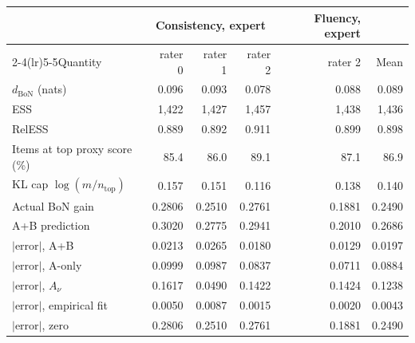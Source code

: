 \begin{tabular}{lrrrrr}
\toprule
 & \multicolumn{3}{c}{Consistency, expert} & Fluency, expert &  \\
\cmidrule(lr){2-4}\cmidrule(lr){5-5}Quantity & rater 0 & rater 1 & rater 2 & rater 2 & Mean \\
\midrule
$d_{\mathrm{BoN}}$ (nats) & 0.096 & 0.093 & 0.078 & 0.088 & 0.089 \\
ESS & 1{,}422 & 1{,}427 & 1{,}457 & 1{,}438 & 1{,}436 \\
RelESS & 0.889 & 0.892 & 0.911 & 0.899 & 0.898 \\
Items at top proxy score (\%) & 85.4 & 86.0 & 89.1 & 87.1 & 86.9 \\
KL cap $\log(m/n_{\mathrm{top}})$ & 0.157 & 0.151 & 0.116 & 0.138 & 0.140 \\
\midrule
Actual BoN gain & 0.2806 & 0.2510 & 0.2761 & 0.1881 & 0.2490 \\
A+B prediction & 0.3020 & 0.2775 & 0.2941 & 0.2010 & 0.2686 \\
\midrule
$|$error$|$, A+B & 0.0213 & 0.0265 & 0.0180 & 0.0129 & 0.0197 \\
$|$error$|$, A-only & 0.0999 & 0.0987 & 0.0837 & 0.0711 & 0.0884 \\
$|$error$|$, $A_\nu$ & 0.1617 & 0.0490 & 0.1422 & 0.1424 & 0.1238 \\
$|$error$|$, empirical fit & 0.0050 & 0.0087 & 0.0015 & 0.0020 & 0.0043 \\
$|$error$|$, zero & 0.2806 & 0.2510 & 0.2761 & 0.1881 & 0.2490 \\
\bottomrule
\end{tabular}
